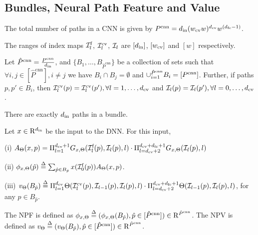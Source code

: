 \subsection{Bundles, Neural Path Feature and Value}
\begin{proposition}
The total number of paths in a CNN is given by  $P^{\text{cnn}}=d_{\text{in}}(w_{\text{cv}} w)^{d_{\text{cv}}}w^{(d_{\text{fc}}-1)}$.
\end{proposition}

\begin{notation}
The ranges of index maps $\mathcal{I}^{\text{f}}_l$,  $\mathcal{I}^{\text{cv}}_l$, $\mathcal{I}_l$ are $[d_{\text{in}}]$, $[w_{\text{cv}}]$ and $[w]$ respectively. 
\end{notation}

\begin{definition}\label{def:bundle}
Let $\hat{P}^{\text{cnn}}=\frac{P^{\text{cnn}}}{d_{\text{in}}}$, and $\{B_1,\ldots, B_{\hat{P}^{\text{cnn}}}\}$ be a collection of sets such that $\forall i,j\in [\hat{P}^{\text{cnn}}], i\neq j$ we have $B_i\cap B_j=\emptyset$ and $\cup_{i=1}^{\hat{P}^{\text{cnn}}}B_i =[P^{\text{cnn}}]$. Further,  if paths $p,p' \in B_i$, then $\mathcal{I}^{\text{cv}}_l(p)=\mathcal{I}^{\text{cv}}_l(p'), \forall l=1,\ldots, d_{\text{cv}}$ and $\mathcal{I}_l(p)=\mathcal{I}_l(p'), \forall l=0,\ldots, d_{\text{cv}}$.
\end{definition}

\begin{proposition}\label{prop:bundle}
There are exactly $d_{\text{in}}$ paths in a bundle.
\end{proposition}

\begin{definition}\label{def:nps} Let $x\in\mathrm{R}^{d_{\text{in}}}$ be the input to the DNN. For this input, 

(i)  $A_{\Theta}(x,p)=\Pi_{l=1}^{d_{\text{cv}}+1} G_{x,\Theta}(\mathcal{I}^{\text{f}}_l(p),\mathcal{I}_l(p),l)\cdot\Pi_{l=d_{\text{cv}}+2}^{d_{\text{cv}}+d_{\text{fc}}+1} G_{x,\Theta}(\mathcal{I}_l(p),l)$

(ii)  $\phi_{x,\Theta}(\hat{p})\stackrel{\Delta}{=} \sum_{\hat{p}\in B_{\hat{p}}}x(\mathcal{I}^{\text{f}}_0(p))A_{\Theta}(x,p)$.

(iii)  $v_{\Theta}(B_{\hat{p}})\stackrel{\Delta}{=} \Pi_{l=1}^{d_{\text{cv}}} \Theta(\mathcal{I}^{\text{cv}}_{l}(p),\mathcal{I}_{l-1}(p),\mathcal{I}_{l}(p),l) \cdot \Pi_{l=d_{\text{cv}}+2}^{d_{\text{cv}}+d_{\text{fc}}+1} \Theta(\mathcal{I}_{l-1}(p),\mathcal{I}_l(p),l)$, for any $p\in B_{\hat{p}}$.

The NPF is defined as $\phi_{x,\Theta}\stackrel{\Delta}{=} (\phi_{x,\Theta}(B_{\hat{p}}),\hat{p}\in [\hat{P}^{\text{cnn}}])\in\mathrm{R}^{\hat{P}^{\text{cnn}}}$. The NPV is defined as $v_{\Theta}\stackrel{\Delta}{=} (v_{\Theta}(B_{\hat{p}}),\hat{p}\in [\hat{P}^{\text{cnn}}])\in\mathrm{R}^{\hat{P}^{\text{cnn}}}$.
\end{definition}

